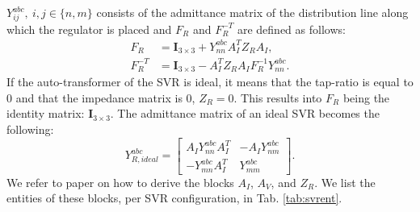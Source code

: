 \documentclass[10pt,journal]{article}
\begin{document}
$Y^{abc}_{ij},\ i,j\in\{n,m\}$ consists of the admittance matrix of the distribution line along which the regulator is placed and $F_R$ and $F_R^{-T}$ are defined as follows: 
\begin{align}
    F_R &= \mathbf{I}_{3\times 3}+Y^{abc}_{nn}A_I^TZ_RA_I,\\
    F_R^{-T} &= \mathbf{I}_{3\times 3} - A_I^T Z_R A_I F_R^{-1}Y_{nn}^{abc}. 
\end{align}
If the auto-transformer of the SVR is ideal, it means that the tap-ratio is equal to $0$ and that the impedance matrix is $0$, $Z_R=0$. This results into $F_R$ being the identity matrix: $\mathbf{I}_{3\times 3}$. The admittance matrix of an ideal SVR becomes the following:
\begin{equation}
    Y^{abc}_{R,ideal}
= \begin{bmatrix}
A_I Y^{abc}_{nn}A_I^T & -A_I  Y^{abc}_{nm} \\ 
-Y^{abc}_{mn}A_I^T & Y^{abc}_{mm}
\end{bmatrix}.
\end{equation}
We refer to paper \cite{} on how to derive the blocks $A_I$, $A_V$, and $Z_R$. We list the entities of these blocks, per SVR configuration, in Tab. \ref{tab:svrent}.
\end{document}
